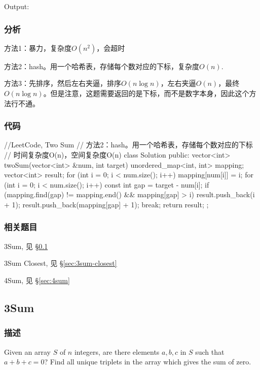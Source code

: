Output: 


\subsubsection{分析}
方法1：暴力，复杂度$O(n^2)$，会超时

方法2：hash。用一个哈希表，存储每个数对应的下标，复杂度$O(n)$.

方法3：先排序，然后左右夹逼，排序$O(n\log n)$，左右夹逼$O(n)$，最终$O(n\log 
n)$。但是注意，这题需要返回的是下标，而不是数字本身，因此这个方法行不通。


\subsubsection{代码}
\begin{Code}
	//LeetCode, Two Sum
	// 方法2：hash。用一个哈希表，存储每个数对应的下标
	// 时间复杂度O(n)，空间复杂度O(n)
	class Solution {
		public:
		vector<int> twoSum(vector<int> &num, int target) {
			unordered_map<int, int> mapping;
			vector<int> result;
			for (int i = 0; i < num.size(); i++) {
				mapping[num[i]] = i;
			}
			for (int i = 0; i < num.size(); i++) {
				const int gap = target - num[i];
				if (mapping.find(gap) != mapping.end() && mapping[gap] > i) {
					result.push_back(i + 1);
					result.push_back(mapping[gap] + 1);
					break;
				}
			}
			return result;
		}
	};
\end{Code}


\subsubsection{相关题目}
\begindot
\item 3Sum, 见 \S \ref{sec:3sum}
\item 3Sum Closest, 见 \S \ref{sec:3sum-closest}
\item 4Sum, 见 \S \ref{sec:4sum}
\myenddot


\subsection{3Sum} %
\label{sec:3sum}


\subsubsection{描述}
Given an array $S$ of $n$ integers, are there elements $a, b, c$ in $S$ such 
that $a + b + c = 0$? Find all unique triplets in the array which gives the sum 
of zero.

